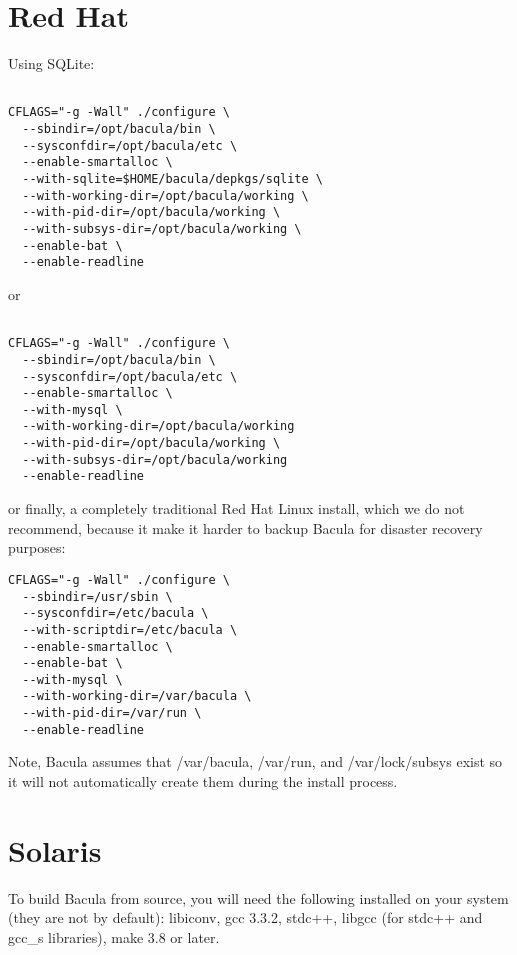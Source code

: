 \section{Red Hat}

Using SQLite: 

\footnotesize
\begin{verbatim}
 
CFLAGS="-g -Wall" ./configure \
  --sbindir=/opt/bacula/bin \
  --sysconfdir=/opt/bacula/etc \
  --enable-smartalloc \
  --with-sqlite=$HOME/bacula/depkgs/sqlite \
  --with-working-dir=/opt/bacula/working \
  --with-pid-dir=/opt/bacula/working \
  --with-subsys-dir=/opt/bacula/working \
  --enable-bat \
  --enable-readline
\end{verbatim}
\normalsize

or 

\footnotesize
\begin{verbatim}
 
CFLAGS="-g -Wall" ./configure \
  --sbindir=/opt/bacula/bin \
  --sysconfdir=/opt/bacula/etc \
  --enable-smartalloc \
  --with-mysql \
  --with-working-dir=/opt/bacula/working
  --with-pid-dir=/opt/bacula/working \
  --with-subsys-dir=/opt/bacula/working
  --enable-readline
\end{verbatim}
\normalsize

or finally, a completely traditional Red Hat Linux install,
which we do not recommend, because it make it harder to
backup Bacula for disaster recovery purposes:

\footnotesize
\begin{verbatim}
CFLAGS="-g -Wall" ./configure \
  --sbindir=/usr/sbin \
  --sysconfdir=/etc/bacula \
  --with-scriptdir=/etc/bacula \
  --enable-smartalloc \
  --enable-bat \
  --with-mysql \
  --with-working-dir=/var/bacula \
  --with-pid-dir=/var/run \
  --enable-readline
\end{verbatim}
\normalsize

Note, Bacula assumes that /var/bacula, /var/run, and /var/lock/subsys exist so
it will not automatically create them during the install process. 

\section{Solaris}

To build Bacula from source, you will need the following installed on your
system (they are not by default): libiconv, gcc 3.3.2, stdc++, libgcc (for
stdc++ and gcc\_s libraries), make 3.8 or later. 


